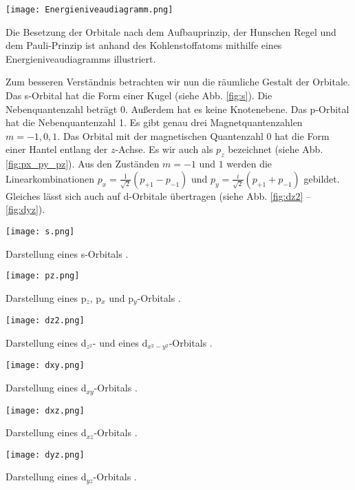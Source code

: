 \begin{dsafigure}
 \centering
 \texttt{[image: Energieniveaudiagramm.png]}
 \caption{Die Besetzung der Orbitale nach dem Aufbauprinzip, der Hunschen Regel und dem Pauli-Prinzip ist anhand des Kohlenstoffatoms mithilfe eines Energieniveaudiagramms illustriert.}
 \label{fig:Energieniveaudiagramm}
\end{dsafigure}

Zum besseren Verständnis betrachten wir nun die räumliche Gestalt der Orbitale.
Das s-Orbital hat die Form einer Kugel (siehe Abb. \ref{fig:s}).
Die Nebenquantenzahl beträgt $0$. Außerdem hat es keine Knotenebene. Das
p-Orbital hat die Nebenquantenzahl 1. Es gibt genau drei Magnetquantenzahlen
$m = -1, 0, 1$. Das Orbital mit der magnetischen Quantenzahl $0$ hat die Form
einer Hantel entlang der $z$-Achse. Es wir auch als $p_{z}$ bezeichnet
(siehe Abb. \ref{fig:px_py_pz}). Aus den Zuständen $m = -1$ und $1$ werden
die Linearkombinationen $p_{x} = \frac{1}{\sqrt{2}} (p_{+1} - p_{-1})$
und $p_{y} = \frac{i}{\sqrt{2}}(p_{+1}+p_{-1})$
gebildet. Gleiches lässt sich auch auf
d-Orbitale übertragen (siehe Abb. \ref{fig:dz2} -- \ref{fig:dyz}).

\begin{dsafigure}
 \centering
 \texttt{[image: s.png]}
 \caption{Darstellung eines s-Orbitals \cite{ADF2017authors}.}
 \label{fig:s}
\end{dsafigure}

\begin{dsafigure}
 \centering
 \texttt{[image: pz.png]}
 \caption{Darstellung eines p$_{z}$, p$_{x}$ und p$_{y}$-Orbitals \cite{ADF2017authors}.}
 \label{fig:px_py_pz}
\end{dsafigure}

\begin{dsafigure}
 \centering
 \hfill
 \texttt{[image: dz2.png]}
 \hfill
 \hfill
 \caption{Darstellung eines d$_{z^{2}}$- und eines d$_{x^{2}-y^{2}}$-Orbitals
          \cite{ADF2017authors}.}
 \label{fig:dz2}
\end{dsafigure}

\begin{dsafigure}
 \centering
 \texttt{[image: dxy.png]}
 \caption{Darstellung eines d$_{xy}$-Orbitals \cite{ADF2017authors}.}
 \label{fig:dxy}
\end{dsafigure}

\begin{dsafigure}
 \centering
 \texttt{[image: dxz.png]}
 \caption{Darstellung eines d$_{xz}$-Orbitals \cite{ADF2017authors}.}
 \label{fig:dxz}
\end{dsafigure}

\begin{dsafigure}
 \centering
 \texttt{[image: dyz.png]}
 \caption{Darstellung eines d$_{yz}$-Orbitals \cite{ADF2017authors}.}
 \label{fig:dyz}
\end{dsafigure}

